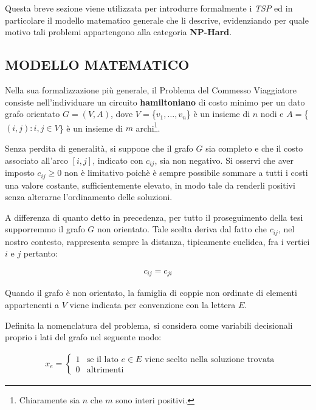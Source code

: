 \documentclass[11pt]{article}
\begin{document}
Questa breve sezione viene utilizzata per introdurre formalmente i \textit{TSP} ed in particolare il modello matematico generale che li descrive, evidenziando per quale motivo tali problemi appartengono alla categoria \textbf{NP-Hard}.

\subsection*{MODELLO MATEMATICO}
\label{sec:ModelloMatematicoS}

Nella sua formalizzazione più generale, il Problema del Commesso Viaggiatore consiste nell'individuare un circuito \textbf{hamiltoniano} di costo minimo per un dato grafo orientato $G=(V,A)$, dove $V = $\{$ {v_1,\dots,v_n} $\}$ $ è un insieme di $n$ nodi e $A = $\{$ {(i,j): i, j \in V} $\}$ $ è un insieme di $m$ archi\footnote{Chiaramente sia $n$ che $m$ sono interi positivi.}.

Senza perdita di generalità, si suppone che il grafo $G$ sia completo e che il costo associato all'arco $[i,j]$, indicato con $c_{ij}$, sia non negativo. Si osservi che aver imposto $c_{ij} \ge 0$ non è limitativo poichè è sempre possibile sommare a tutti i costi una valore costante, sufficientemente elevato, in modo tale da renderli positivi senza alterarne l'ordinamento delle soluzioni.

A differenza di quanto detto in precedenza, per tutto il proseguimento della tesi supporremmo il grafo $G$ non orientato. Tale scelta deriva dal fatto che $c_{ij}$, nel nostro contesto, rappresenta sempre la distanza, tipicamente euclidea, fra i vertici $i$ e $j$ pertanto:

\begin{eqnarray}
c_{ij} = c_{ji}
\end{eqnarray}

Quando il grafo è non orientato, la famiglia di coppie non ordinate di elementi appartenenti a $V$ viene indicata per convenzione con la lettera $E$.

Definita la nomenclatura del problema, si considera come variabili decisionali proprio i lati del grafo nel seguente modo:

\begin{eqnarray}
&\displaystyle x_{e}=
\begin{cases}
1 & \text{se il lato $e \in E$ viene scelto nella soluzione trovata} \\
0 & \text{altrimenti}
\end{cases}
\end{eqnarray}
\end{document}
